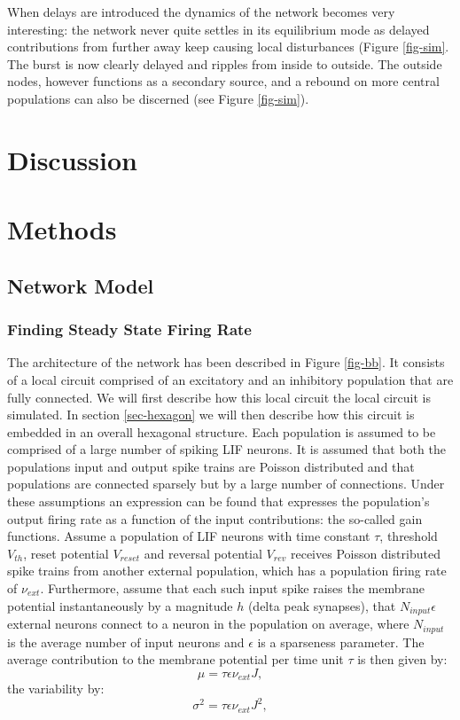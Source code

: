 \documentclass[12pt]{article}
\begin{document}
When delays are introduced the dynamics of the network becomes very interesting: the network never quite settles in its equilibrium mode as
delayed contributions from further away keep  causing local disturbances (Figure \ref{fig-sim}. The burst is now clearly delayed and
ripples from inside to outside. The outside nodes, however functions as a secondary source, and a rebound on more central populations can
also be discerned (see Figure \ref{fig-sim}).

\section{Discussion}

\section*{Methods}
\label{sec-methods}
\subsection{Network Model}
\subsubsection{Finding Steady State Firing Rate}
\label{sec-steady}
The architecture of the network has been described in Figure \ref{fig-bb}. It consists of a local circuit comprised of an excitatory and an inhibitory
population that are fully connected. We will first describe how this local circuit the local circuit is simulated. 
In section \ref{sec-hexagon} we will then describe how this circuit is embedded in an overall hexagonal structure.
Each population
is assumed to be comprised of a large number of spiking LIF neurons. It is assumed that both the populations input and output spike trains
are Poisson distributed and that populations are connected sparsely but by a large number of connections. Under these assumptions an expression
can be found that expresses the population's output firing rate as a function of the input contributions: the so-called gain functions.
Assume a population of LIF neurons with time constant $\tau$, threshold $V_{th}$, reset potential $V_{reset}$ and reversal potential $V_{rev}$
receives Poisson distributed spike trains from another external population, which has a population firing rate of $\nu_{ext}$. 
Furthermore, assume that each such input spike raises the membrane potential
instantaneously by a magnitude $h$ (delta peak synapses), that $N_{input}\epsilon$ external neurons connect to a neuron in the population on average, 
where $N_{input}$ is the average number of input neurons and $\epsilon$ is a sparseness parameter. The average contribution to the
membrane potential per time unit $\tau$ is then given by:
\begin{equation}
  \mu = \tau \epsilon \nu_{ext} J, 
\end{equation}
the variability by:
\begin{equation}
  \sigma^2 = \tau \epsilon \nu_{ext} J^2,
\end{equation}
\end{document}
